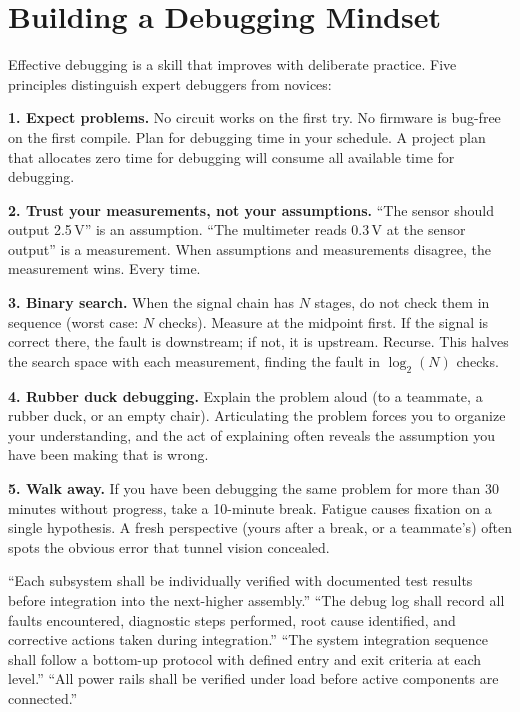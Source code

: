\documentclass[11pt,letterpaper,twoside,openany]{book}
\begin{document}
\section{Building a Debugging Mindset}

Effective debugging is a skill that improves with deliberate practice. Five principles distinguish expert debuggers from novices:

\textbf{1. Expect problems.} No circuit works on the first try. No firmware is bug-free on the first compile. Plan for debugging time in your schedule. A project plan that allocates zero time for debugging will consume all available time for debugging.

\textbf{2. Trust your measurements, not your assumptions.} ``The sensor should output 2.5\,V'' is an assumption. ``The multimeter reads 0.3\,V at the sensor output'' is a measurement. When assumptions and measurements disagree, the measurement wins. Every time.

\textbf{3. Binary search.} When the signal chain has $N$ stages, do not check them in sequence (worst case: $N$ checks). Measure at the midpoint first. If the signal is correct there, the fault is downstream; if not, it is upstream. Recurse. This halves the search space with each measurement, finding the fault in $\log_2(N)$ checks.

\textbf{4. Rubber duck debugging.} Explain the problem aloud (to a teammate, a rubber duck, or an empty chair). Articulating the problem forces you to organize your understanding, and the act of explaining often reveals the assumption you have been making that is wrong.

\textbf{5. Walk away.} If you have been debugging the same problem for more than 30 minutes without progress, take a 10-minute break. Fatigue causes fixation on a single hypothesis. A fresh perspective (yours after a break, or a teammate's) often spots the obvious error that tunnel vision concealed.

\begin{keyconceptbox}
``Each subsystem shall be individually verified with documented test results before integration into the next-higher assembly.'' ``The debug log shall record all faults encountered, diagnostic steps performed, root cause identified, and corrective actions taken during integration.'' ``The system integration sequence shall follow a bottom-up protocol with defined entry and exit criteria at each level.'' ``All power rails shall be verified under load before active components are connected.''
\end{keyconceptbox}
\end{document}
